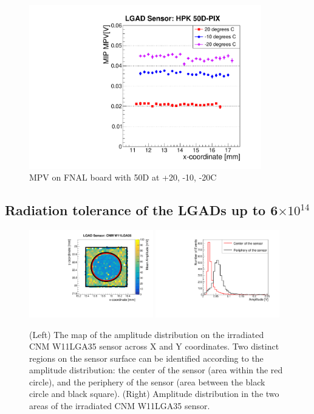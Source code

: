 \documentclass[preprint,1p]{elsarticle}
\begin{document}
\begin{figure}[htbp] 
\centering
\includegraphics[width=0.9\textwidth]{figs/FNAL_MPV_vs_X_HPK50D_TemperatureDependance.pdf} 
\caption{MPV on FNAL board with 50D at +20, -10, -20C} 
\label{fig:Sensors} 
\end{figure} 

\subsection{Radiation tolerance of the LGADs up to 6$\times 10^{14}$}

\begin{figure}[htbp] 
\centering
\includegraphics[width=0.48\textwidth]{figs/USCSBoard_HPK50DIrradiated-CNMW11LGA35_Run936-961/CNM_irradiated_amp_Map.pdf} \hfill
\includegraphics[width=0.48\textwidth]{figs/USCSBoard_HPK50DIrradiated-CNMW11LGA35_Run936-961/CNM_irradiated_amp_1D.pdf} 
\caption{(Left) The map of the amplitude distribution on the irradiated CNM W11LGA35 sensor across X and Y coordinates. Two distinct regions on the sensor surface can be identified according to the amplitude distribution: the center of the sensor (area within the red circle), and the periphery of the sensor (area between the black circle and black square). (Right) Amplitude distribution in the two areas of the irradiated CNM W11LGA35 sensor.} 
\label{fig:Sensors} 
\end{figure} 
\end{document}
